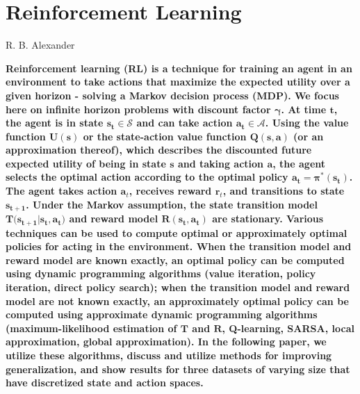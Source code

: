 \documentclass[10pt,letterpaper]{article}
\begin{document}
		
	
	\section*{\sf \textbf{Reinforcement Learning}}
	\vspace*{-0.1 in}
	{\noindent \sf \large R. B. Alexander}
	
	\vspace*{0.2 in}
	
\begin{adjustwidth}{1cm}{1cm}
		
	\noindent \textbf{Reinforcement learning (RL) is a technique for training an agent in an environment to take actions that maximize the expected utility over a given horizon - solving a Markov decision process (MDP). We focus here on infinite horizon problems with discount factor $\boldsymbol\gamma$. At time $\boldsymbol t$, the agent is in state $\boldsymbol{s_t} \boldsymbol{\in} \boldsymbol{\mathcal{S}}$ and can take action $\boldsymbol{a_t} \boldsymbol{\in} \boldsymbol{\mathcal{A}}$. Using the value function $\boldsymbol{U(s)}$ or the state-action value function $\boldsymbol{Q(s,a)}$ (or an approximation thereof), which describes the discounted future expected utility of being in state $\boldsymbol s$ and taking action $\boldsymbol a$, the agent selects the optimal action according to the optimal policy $\boldsymbol{a_t} = \boldsymbol{\pi^*(s_t)}$. The agent takes action $\boldsymbol a_t$, receives reward $\boldsymbol r_t$, and transitions to state $\boldsymbol{ s_{t+1}}$. Under the Markov assumption, the state transition model $\boldsymbol{T(s_{t+1}} \boldsymbol{\mid} \boldsymbol{s_t}, \boldsymbol{a_t})$ and reward model $\boldsymbol{R(s_t,a_t)}$ are stationary. Various techniques can be used to compute optimal or approximately optimal policies for acting in the environment. When the transition model and reward model are known exactly, an optimal policy can be computed using dynamic programming algorithms (value iteration, policy iteration, direct policy search); when the transition model and reward model are not known exactly, an approximately optimal policy can be computed using approximate dynamic programming algorithms (maximum-likelihood estimation of $\boldsymbol T$ and $\boldsymbol R$, Q-learning, SARSA, local approximation, global approximation). In the following paper, we utilize these algorithms, discuss and utilize methods for improving generalization, and show results for three datasets of varying size that have discretized state and action spaces.}
	
\end{adjustwidth}
		
\end{document}
